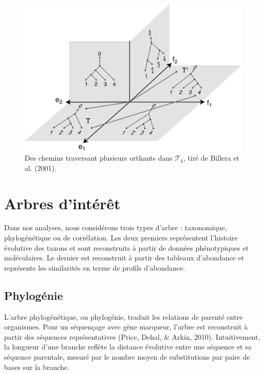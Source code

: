 \documentclass[12pt,a4paper]{reedthesis}
\theoremstyle{definition}
\theoremstyle{definition}
\theoremstyle{definition}
\theoremstyle{remark}
\begin{document}
\begin{figure}

{\centering \includegraphics[width=0.9\linewidth]{img/bhv_dist} 

}

\caption{Des chemins traversant plusieurs orthants dans \(\mathscr{T}_4\), tiré de Billera et al. (2001).}\label{fig:bhvdist}
\end{figure}
\hypertarget{arbres-dintuxe9ruxeat}{%
\section{Arbres d'intérêt}\label{arbres-dintuxe9ruxeat}}

Dans nos analyses, nous considérons trois types d'arbre : taxonomique, phylogénétique ou de corrélation. Les deux premiers représentent l'histoire évolutive des taxons et sont reconstruits à partir de données phénotypiques et moléculaires. Le dernier est reconstruit à partir des tableaux d'abondance et représente les similarités en terme de profils d'abondance.

\hypertarget{phyloguxe9nie}{%
\subsection{Phylogénie}\label{phyloguxe9nie}}

L'arbre phylogénétique, ou phylogénie, traduit les relations de parenté entre organismes. Pour un séquençage avec gène marqueur, l'arbre est reconstruit à partir des séquences représentatives (Price, Dehal, \& Arkin, 2010). Intuitivement, la longueur d'une branche reflète la distance évolutive entre une séquence et sa séquence parentale, mesuré par le nombre moyen de substitutions par paire de bases sur la branche.
\end{document}
